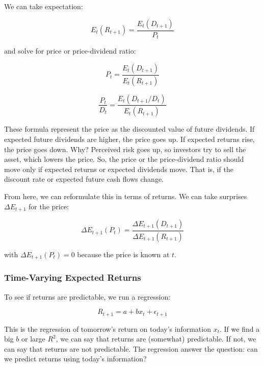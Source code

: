 We can take expectation:

\begin{equation}
    E_t(R_{t+1}) = \frac{E_t(D_{t+1}) }{P_t}
\end{equation}

and solve for price or price-dividend ratio:

\begin{equation}
    P_t = \frac{E_t(D_{t+1})}{E_t(R_{t+1})}
\end{equation}

\begin{equation}
    \frac{P_t}{D_t} = \frac{E_t(D_{t+1}/D_t)}{E_t(R_{t+1})}
\end{equation}

These formula represent the price as the discounted value 
of future dividends. If expected future dividends are higher,
the price goes up. If expected returns rise, the price goes down.
Why? Perceived risk goes up, so investors try to sell the asset,
which lowers the price. So, the price or the price-dividend ratio
should move only if expected returns or expected dividends move.
That is, if the discount rate or expected future cash flows change.

From here, we can reformulate this in terms of returns. We
can take surprises $\Delta E_{t+1}$ for the price:

\begin{equation}
    \Delta E_{t+1} (P_t) = \frac{\Delta E_{t+1}(D_{t+1})}{\Delta E_{t+1}(R_{t+1})}
\end{equation}

with $\Delta E_{t+1}(P_t) = 0$ because the price is known at $t$.


\subsubsection{Time-Varying Expected Returns}

To see if returns are predictable, we run a regression:

\begin{equation}
    R_{t+1} = a + bx_t + \epsilon_{t+1}
\end{equation}

This is the regression of tomorrow's return on today's
information $x_t$. If we find a big $b$ or large $R^2$,
we can say that returns are (somewhat) predictable.
If not, we can say that returns are not predictable.
The regression answer the question: can we predict
returns using today's information?

